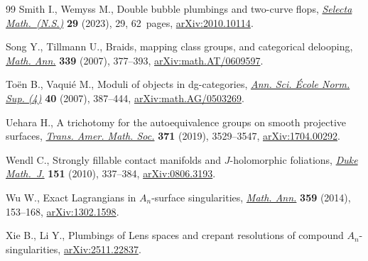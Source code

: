 \documentclass[10pt,a4paper]{amsart}
\theoremstyle{definition}
\numberwithin{equation}{section}
\begin{document}
\begin{thebibliography}{99}
Smith I., Wemyss M., Double bubble plumbings and two-curve flops,
 \href{https://doi.org/10.1007/s00029-023-00828-z}{\textit{Selecta
 Math.~(N.S.)}} \textbf{29} (2023), 29, 62~pages,
 \href{http://arxiv.org/abs/2010.10114}{arXiv:2010.10114}.

Song Y., Tillmann U., Braids, mapping class groups, and categorical delooping,
 \href{https://doi.org/10.1007/s00208-007-0117-z}{\textit{Math. Ann.}}
 \textbf{339} (2007), 377--393, \href{http://arxiv.org/abs/math.AT/0609597}{arXiv:math.AT/0609597}.

To\"{e}n B., Vaqui\'e M., Moduli of objects in dg-categories,
 \href{https://doi.org/10.1016/j.ansens.2007.05.001}{\textit{Ann. Sci.
 \'{E}cole Norm. Sup. (4)}} \textbf{40} (2007), 387--444, \href{http://arxiv.org/abs/math.AG/0503269}{arXiv:math.AG/0503269}.

Uehara H., A trichotomy for the autoequivalence groups on smooth projective
 surfaces, \href{https://doi.org/10.1090/tran/7439}{\textit{Trans. Amer. Math.
 Soc.}} \textbf{371} (2019), 3529--3547, \href{http://arxiv.org/abs/1704.00292}{arXiv:1704.00292}.

Wendl C., Strongly fillable contact manifolds and {$J$}-holomorphic foliations,
 \href{https://doi.org/10.1215/00127094-2010-001}{\textit{Duke Math.~J.}}
 \textbf{151} (2010), 337--384, \href{http://arxiv.org/abs/0806.3193}{arXiv:0806.3193}.

Wu W., Exact {L}agrangians in {$A_n$}-surface singularities,
 \href{https://doi.org/10.1007/s00208-013-0993-3}{\textit{Math. Ann.}}
 \textbf{359} (2014), 153--168,
 \href{http://arxiv.org/abs/1302.1598}{arXiv:1302.1598}.

Xie B., Li Y., Plumbings of {L}ens spaces and crepant resolutions of compound
 {${A}_n$}-singularities,
 \href{http://arxiv.org/abs/2511.22837}{arXiv:2511.22837}.

\end{thebibliography}
\end{document}
